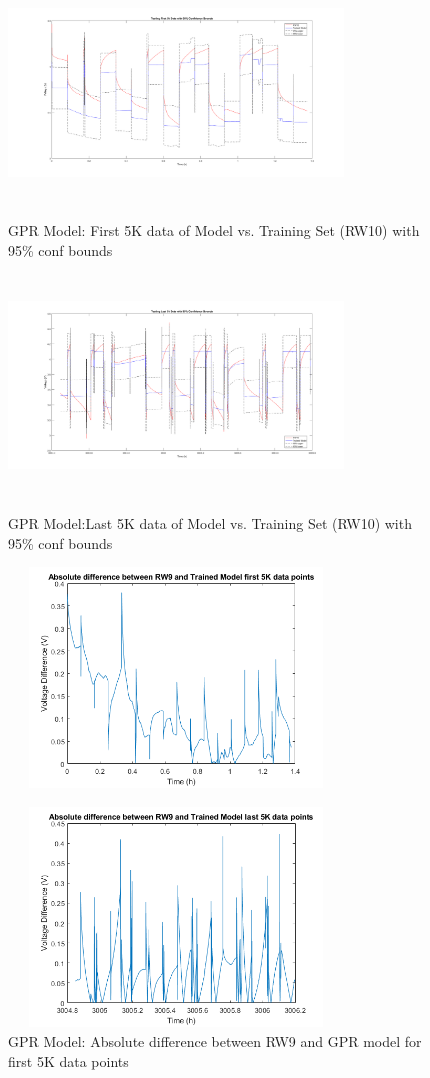 \begin{figure}
\begin{multicols}{2}
	\includegraphics[height=2.3in, width=3.5in]{figures/GPR/first_5k_rw10_v_model_w_bounds}
	\caption{GPR Model: First 5K data of Model vs. Training Set (RW10) with 95\% conf bounds}
	\label{fig:first_5k_rw9_v_model_w_bounds}
	\includegraphics[height=2.3in, width=3.5in]{figures/GPR/last_5k_rw10_v_model_w_bounds}
	\caption{GPR Model:Last 5K data of Model vs. Training Set (RW10) with 95\% conf bounds}
	\label{fig:last_5k_rw9_v_model_w_bounds}
	\includegraphics[height=2.3in, width=3.5in]{figures/GPR/first_5k_rw9_abs_v_diff}
	\caption{GPR Model: Absolute difference between RW9 and GPR model for first 5K data points}
	\label{fig:first_5k_rw9_abs_v_diff}
	\includegraphics[height=2.3in, width=3.5in]{figures/GPR/last_5k_rw9_abs_v_diff}

\end{multicols}
\end{figure}
